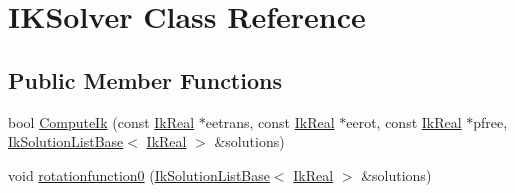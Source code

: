 \hypertarget{classIKSolver}{\section{I\-K\-Solver Class Reference}
\label{classIKSolver}
}
\subsection*{Public Member Functions}
\begin{DoxyCompactItemize}
\item 
bool \hyperlink{classIKSolver_ac0195e291bed491b4cb6a68db8199b55}{Compute\-Ik} (const \hyperlink{ikfast_8h_ad067e4244010306f633e94db2645dd6d}{Ik\-Real} $\ast$eetrans, const \hyperlink{ikfast_8h_ad067e4244010306f633e94db2645dd6d}{Ik\-Real} $\ast$eerot, const \hyperlink{ikfast_8h_ad067e4244010306f633e94db2645dd6d}{Ik\-Real} $\ast$pfree, \hyperlink{classikfast_1_1IkSolutionListBase}{Ik\-Solution\-List\-Base}$<$ \hyperlink{ikfast_8h_ad067e4244010306f633e94db2645dd6d}{Ik\-Real} $>$ \&solutions)
\item 
void \hyperlink{classIKSolver_a139a62477d8d27e5a5dace907f0b38b0}{rotationfunction0} (\hyperlink{classikfast_1_1IkSolutionListBase}{Ik\-Solution\-List\-Base}$<$ \hyperlink{ikfast_8h_ad067e4244010306f633e94db2645dd6d}{Ik\-Real} $>$ \&solutions)
\end{DoxyCompactItemize}
